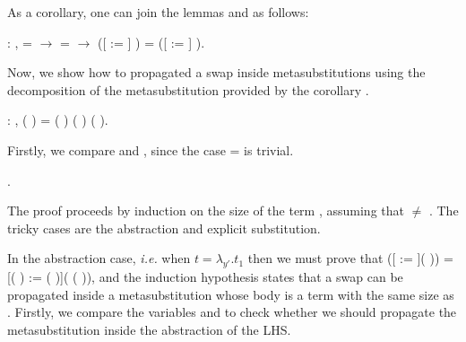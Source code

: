 \begin{coqdoccode}
\coqdocemptyline
\end{coqdoccode}
As a corollary, one can join the lemmas  and  as follows:
\begin{coqdoccode}
\coqdocemptyline
\coqdocnoindent
{} : \coqdockw{\ensuremath{\forall}}     ,  =  \ensuremath{\rightarrow}  =  \ensuremath{\rightarrow} ([ := ] ) = ([ := ] ).\coqdoceol
\coqdocemptyline
\end{coqdoccode}
Now, we show how to propagated a swap inside metasubstitutions using the decomposition of the metasubstitution provided by the corollary .\newline 
\begin{coqdoccode}
\coqdocemptyline
\coqdocnoindent
{} : \coqdockw{\ensuremath{\forall}}     ,    (   ) =  (   ) (   ) (   ).\coqdoceol
\end{coqdoccode}
 Firstly, we compare  and , since the case  =  is trivial.
\begin{coqdoccode}
 . \end{coqdoccode}
The proof proceeds by induction on the size of the term , assuming that  \ensuremath{\not=} . The tricky cases are the abstraction and explicit substitution. 
\begin{coqdoccode}
\end{coqdoccode}
In the abstraction case, {\it i.e.} when $t = \lambda_{y'}.t_1$ then we must prove that    ([ := ](  )) = [(   ) := (   )](   (  )), and the induction hypothesis states that a swap can be propagated inside a metasubstitution whose body is a term with the same size as . Firstly, we compare the variables  and  to check whether we should propagate the metasubstitution inside the abstraction of the LHS. 
